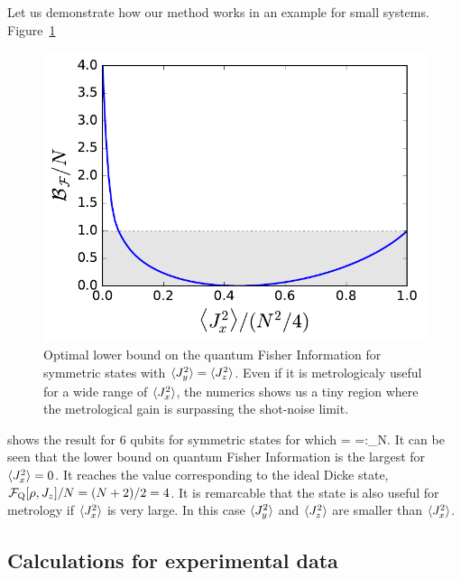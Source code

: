 Let us demonstrate how our method works in an example for small systems.
Figure~\ref{fig:lt-symmetric-dicke-6-bound}
\begin{figure}[htp]
  \centering
  \includegraphics[scale=.65]{img/LT_dicke_edge.pdf}
  \caption[6-particles optimal bound on BEC symmetry for the QFI when $\{\expect{J_x^2},\expect{J_y^2},\expect{J_z^2}\}$ are measured]{Optimal lower bound on the quantum Fisher Information for symmetric states with $\langle{J_y^2}\rangle=\langle{J_z^2}\rangle$. Even if it is metrologicaly useful for a wide range of $\langle{J_x^2}\rangle$, the numerics shows us a tiny region where the metrological gain is surpassing the shot-noise limit.}
  \label{fig:lt-symmetric-dicke-6-bound}
\end{figure}
shows the result for 6 qubits for symmetric states for which
\be
  \label{eq:lt-maximum-angular-momentum}
   = =:_N.
\ee
It can be seen that the lower bound on quantum Fisher Information is the largest for $\langle{J_x^2}\rangle=0$.
It reaches the value corresponding to the ideal Dicke state, $\mathcal{F}_{\textnormal{Q}}[{\textstyle \rho,J_z}]/N=(N+2)/2=4$.
It is remarcable that the state is also useful for metrology if $\langle{J_x^2}\rangle$ is very large.
In this case $\langle{J_y^2}\rangle$ and $\langle{J_z^2}\rangle$ are smaller than $\langle{J_x^2}\rangle$.

\subsection{Calculations for experimental data}

